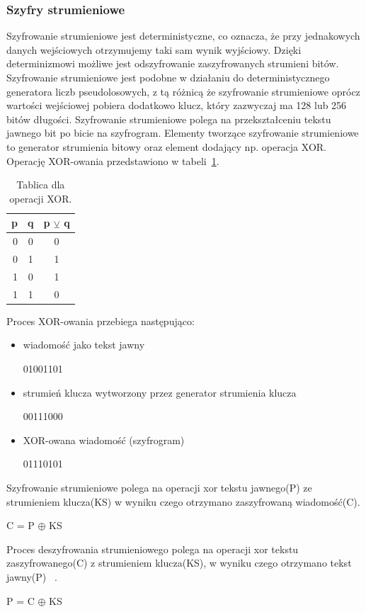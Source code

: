 \documentclass[12p]{article}
\begin{document}
\subsubsection{Szyfry strumieniowe}
\quad Szyfrowanie strumieniowe jest deterministyczne, co oznacza, że przy jednakowych danych wejściowych otrzymujemy taki sam wynik wyjściowy. Dzięki determinizmowi możliwe jest odszyfrowanie zaszyfrowanych strumieni bitów. Szyfrowanie strumieniowe jest podobne w działaniu do deterministycznego generatora liczb pseudolosowych, z tą różnicą że szyfrowanie strumieniowe oprócz wartości wejściowej pobiera dodatkowo klucz, który zazwyczaj ma 128 lub 256 bitów długości. Szyfrowanie strumieniowe polega na przekształceniu tekstu jawnego bit po bicie na szyfrogram. Elementy tworzące szyfrowanie strumieniowe to generator strumienia bitowy oraz element dodający np. operacja XOR. 
Operację XOR-owania przedstawiono w tabeli~\ref{xor}.

\begin{table}[H]
\centering
\begin{tabular}{|r|c|l|}
\hline
p & q & p $\veebar$ q \\
\hline
0 & 0 & \multicolumn{1}{|c|}{0} \\
\hline
0 & 1 & \multicolumn{1}{|c|}{1} \\
\hline
1 & 0 & \multicolumn{1}{|c|}{1} \\
\hline
1 & 1 & \multicolumn{1}{|c|}{0} \\
\hline
\end{tabular}
\caption{Tablica dla operacji XOR.}\label{xor}
\end{table}

Proces XOR-owania przebiega następująco:
\begin{itemize}
\item wiadomość jako tekst jawny \newline
\begin{center}
01001101
\end{center}
\item strumień klucza wytworzony przez generator strumienia klucza \newline
\begin{center}
00111000
\end{center}
\item XOR-owana wiadomość (szyfrogram) \newline
\begin{center}
01110101
\end{center}
\end{itemize}
Szyfrowanie strumieniowe polega na operacji xor tekstu jawnego(P) ze strumieniem klucza(KS) w wyniku czego otrzymano zaszyfrowaną wiadomość(C).\newline
\begin{center}
C = P $\oplus$ KS
\end{center}
Proces deszyfrowania strumieniowego polega na operacji xor tekstu zaszyfrowanego(C) z strumieniem klucza(KS), w wyniku czego otrzymano tekst jawny(P) ~\cite{stream_cipher}.\newline
\begin{center}
P = C $\oplus$ KS
\end{center}
\end{document}
